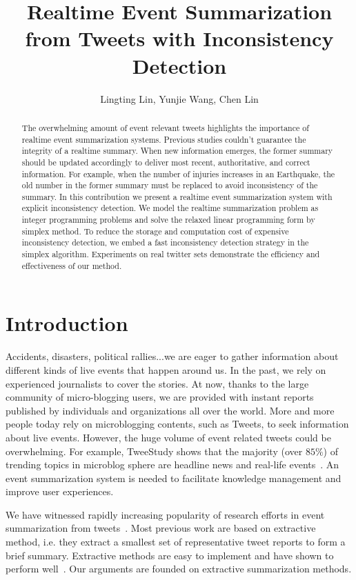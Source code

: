 \documentclass{llncs}
\begin{document}
\title{Realtime Event Summarization from Tweets with Inconsistency Detection}
\author{Lingting Lin, Yunjie Wang, Chen Lin}

\maketitle
\begin{abstract}
The overwhelming amount of event relevant tweets highlights the importance of realtime event summarization systems. Previous studies couldn't guarantee the integrity of a realtime summary. When new information emerges, the former summary should be updated accordingly to deliver most recent, authoritative, and correct information. For example, when the number of injuries increases in an Earthquake, the old number in the former summary must be replaced to avoid inconsistency of the summary. In this contribution we present a realtime event summarization system with explicit inconsistency detection. We model the realtime summarization problem as integer programming problems and solve the relaxed linear programming form by simplex method. To reduce the storage and computation cost of expensive inconsistency detection, we embed a fast inconsistency detection strategy in the simplex algorithm. Experiments on real twitter sets demonstrate the efficiency and effectiveness of our method. 
\end{abstract}
\section{Introduction}
Accidents, disasters, political rallies...we are eager to gather information about different kinds of live events that happen around us. In the past, we rely on experienced journalists to cover the stories. At now, thanks to the large community of micro-blogging users, we are provided with instant reports published by individuals and organizations all over the world.  More and more people today rely on microblogging contents, such as Tweets, to seek information about live events. However, the huge volume of event related tweets could be overwhelming. For example, TweeStudy shows that the majority (over $85\%$) of trending topics in microblog sphere are headline news and real-life events~\cite{kwak2010twitter}. An event summarization system is needed to facilitate knowledge management and improve user experiences.

We have witnessed rapidly increasing popularity of research efforts in event summarization from tweets~\cite{Takamura2011Summarizing,Lin2012Generating,Rudra2015Extracting,Shou2013Sumblr,Liu2016LEDS,Gillani2017Post,Zubiaga2012Towards,Sharifi2010Summarizing}.   Most previous work are based on extractive method, i.e. they extract a smallest set of representative tweet reports to form a brief summary. Extractive methods are easy to implement and have shown to perform well~\cite{Takamura2011Summarizing,Lin2012Generating,Rudra2015Extracting,Shou2013Sumblr,Liu2016LEDS,Gillani2017Post,Zubiaga2012Towards}. Our arguments are founded on extractive summarization methods.
\end{document}
